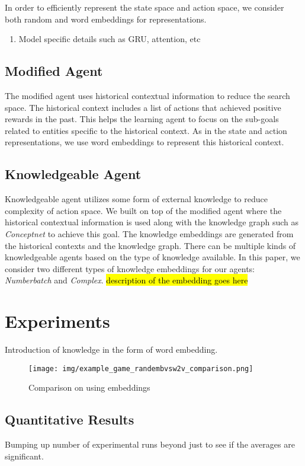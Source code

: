 \documentclass[letterpaper]{article} \usepackage{aaai20}  \usepackage{times}  \usepackage{helvet} \usepackage{courier}  \usepackage[hyphens]{url}  \usepackage{graphicx} \urlstyle{rm} \def\UrlFont{\rm}  \usepackage{graphicx}  \frenchspacing  \setlength{\pdfpagewidth}{8.5in}  \setlength{\pdfpageheight}{11in}
\begin{document}
In order to efficiently represent the state space and action space, we consider both random and word embeddings for representations. 

\begin{enumerate}
    \item Model specific details such as GRU, attention, etc
\end{enumerate}


\subsection{Modified Agent}

The modified agent uses historical contextual information to reduce the search space. The historical context includes a list of actions that achieved positive rewards in the past. This helps the learning agent to focus on the sub-goals related to entities specific to the historical context. As in the state and action representations, we use word embeddings to represent this historical context.



\subsection{Knowledgeable Agent}
Knowledgeable agent utilizes some form of external knowledge to reduce complexity of action space. We built on top of the modified agent where the historical contextual information is used along with the knowledge graph such as \textit{Conceptnet} to achieve this goal. The knowledge embeddings are generated from the historical contexts and the knowledge graph.
There can be multiple kinds of knowledgeable agents based on the type of knowledge available. In this paper, we consider two different types of knowledge embeddings for our agents: \textit{Numberbatch} and \textit{Complex}. 
\hl{description of the embedding goes here}
\section{Experiments}

Introduction of knowledge in the form of word embedding.
\begin{figure}[htp]
    \centering
    \texttt{[image: img/example\_game\_randembvsw2v\_comparison.png]}
    \caption{Comparison on using embeddings}
    \label{fig:embed}
\end{figure}

\subsection{Quantitative Results}
Bumping up number of experimental runs beyond just  to see if the averages are significant.
\end{document}
